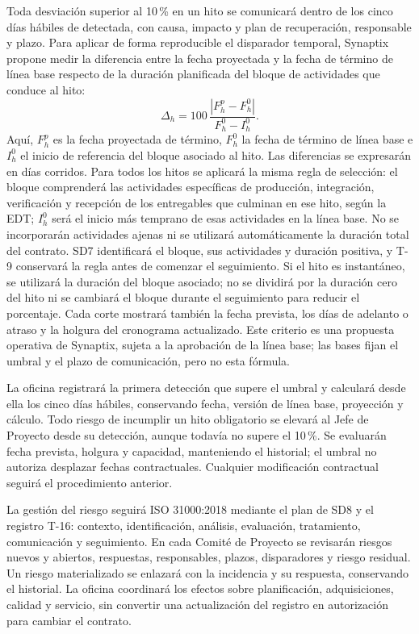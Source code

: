 Toda desviación superior al 10\,\% en un hito se comunicará dentro de los cinco días hábiles de detectada, con causa, impacto y plan de recuperación, responsable y plazo. Para aplicar de forma reproducible el disparador temporal, Synaptix propone medir la diferencia entre la fecha proyectada y la fecha de término de línea base respecto de la duración planificada del bloque de actividades que conduce al hito:
\[
\Delta_h=100\,\frac{\left|F_h^{p}-F_h^{0}\right|}{F_h^{0}-I_h^{0}}.
\]
Aquí, $F_h^{p}$ es la fecha proyectada de término, $F_h^{0}$ la fecha de término de línea base e $I_h^{0}$ el inicio de referencia del bloque asociado al hito. Las diferencias se expresarán en días corridos. Para todos los hitos se aplicará la misma regla de selección: el bloque comprenderá las actividades específicas de producción, integración, verificación y recepción de los entregables que culminan en ese hito, según la EDT; $I_h^{0}$ será el inicio más temprano de esas actividades en la línea base. No se incorporarán actividades ajenas ni se utilizará automáticamente la duración total del contrato. SD7 identificará el bloque, sus actividades y duración positiva, y T-9 conservará la regla antes de comenzar el seguimiento. Si el hito es instantáneo, se utilizará la duración del bloque asociado; no se dividirá por la duración cero del hito ni se cambiará el bloque durante el seguimiento para reducir el porcentaje. Cada corte mostrará también la fecha prevista, los días de adelanto o atraso y la holgura del cronograma actualizado. Este criterio es una propuesta operativa de Synaptix, sujeta a la aprobación de la línea base; las bases fijan el umbral y el plazo de comunicación, pero no esta fórmula. \parencite[RT-19.10, p.~34]{sd6-bt}

La oficina registrará la primera detección que supere el umbral y calculará desde ella los cinco días hábiles, conservando fecha, versión de línea base, proyección y cálculo. Todo riesgo de incumplir un hito obligatorio se elevará al Jefe de Proyecto desde su detección, aunque todavía no supere el 10\,\%. Se evaluarán fecha prevista, holgura y capacidad, manteniendo el historial; el umbral no autoriza desplazar fechas contractuales. Cualquier modificación contractual seguirá el procedimiento anterior.

La gestión del riesgo seguirá ISO 31000:2018 mediante el plan de SD8 y el registro T-16: contexto, identificación, análisis, evaluación, tratamiento, comunicación y seguimiento. En cada Comité de Proyecto se revisarán riesgos nuevos y abiertos, respuestas, responsables, plazos, disparadores y riesgo residual. Un riesgo materializado se enlazará con la incidencia y su respuesta, conservando el historial. La oficina coordinará los efectos sobre planificación, adquisiciones, calidad y servicio, sin convertir una actualización del registro en autorización para cambiar el contrato. \parencites[RT-19.04, p.~33]{sd6-bt}{sd6-iso31000}

